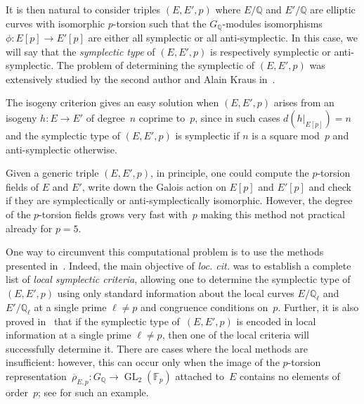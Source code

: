 \documentclass[12pt, reqno]{amsart}
\newcommand{\F}{\mathbb{F}}
\newcommand{\Q}{\mathbb{Q}}
\newcommand{\Z}{\mathbb{Z}}
\newcommand{\rhobar}{{\overline{\rho}}}
\newcommand{\GL}{\operatorname{GL}}
\numberwithin{equation}{section}
\theoremstyle{definition}
\theoremstyle{remark}
\begin{document}
\begin{comment}
both have $5$-torsion Galois module isomorphic to $\mu_5
\times \Z/5\Z$.  Now let $P,Q \in E[5]$ and $P',Q' \in E'[5]$ be bases
such that $P$, $P'$ are defined over~$\Q$.  The map defined by $P
\mapsto P'$ and $Q \mapsto n\cdot Q'$ (with $5 \nmid n$) is a
$G_\Q$-isomorphism which is symplectic if and only if $n$ is a square
mod~$5$.  Moreover, the automorphism $\alpha$ of $E[5]$ given by
$\alpha(P) = P$ and $\alpha(Q) = 2Q$ is anti-symplectic because $2$ is
not a square modulo~$5$.
\end{comment}

It is then natural to consider triples $(E,E',p)$ where $E/\Q$ and $E'/\Q$ are elliptic
curves with isomorphic $p$-torsion such that the $G_\Q$-modules
isomorphisms $\phi : E[p] \rightarrow E'[p]$ are either all symplectic
or all anti-symplectic.  In this case, we will say that the {\em
  symplectic type} of $(E,E',p)$ is respectively symplectic or
anti-symplectic.  The problem of determining the symplectic of
$(E,E',p)$ was extensively studied by the second author and Alain
Kraus in~\cite{FKSym}.

The isogeny criterion gives an easy solution when $(E,E',p)$
arises from an isogeny $h \colon E \to E'$ of degree~$n$ coprime
to~$p$, since in such cases $d(h|_{E[p]}) = n$ and the symplectic type
of $(E,E',p)$ is symplectic if $n$ is a square mod~$p$ and
anti-symplectic otherwise.

Given a generic triple $(E, E', p)$, in principle, one
could compute the $p$-torsion fields of $E$ and $E'$,
write down the Galois action on $E[p]$ and $E'[p]$ and check if they
are symplectically or anti-symplectically isomorphic. However, the
degree of the $p$-torsion fields grows very fast with~$p$ making this
method not practical already for $p = 5$.

One way to circumvent this computational problem is to use the methods
presented in~\cite{FKSym}. Indeed, the main objective of {\it loc. cit.} was to establish a complete list of {\em local symplectic criteria},
allowing one to determine the symplectic type of $(E,E',p)$ using only
standard information about the local curves $E/\Q_\ell$ and
$E'/\Q_\ell$ at a single prime $\ell \neq p$ and congruence conditions
on~$p$. Further, it is also proved in~\cite{FKSym}  that if the
symplectic type of~$(E,E',p)$ is encoded in local information at a
single prime $\ell \neq p$, then one of the local criteria will
successfully determine it.  
There are cases where the local methods
are insufficient: however, this can occur only when the image
of the $p$-torsion representation~$\rhobar_{E,p} : G_\Q \to \GL_2(\F_p)$ attached to~$E$ contains no elements of order~$p$;
see \cite[Proposition~16]{FKSym} for such an example.
\end{document}
